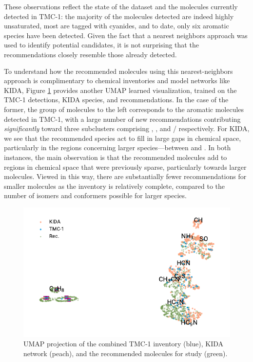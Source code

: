 \documentclass[twocolumn]{aastex63}
\begin{document}
These observations reflect the state of the dataset and the molecules currently detected in TMC-1: the majority of the molecules detected are indeed highly unsaturated, most are tagged with cyanides, and to date, only six aromatic species have been detected. Given the fact that a nearest neighbors approach was used to identify potential candidates, it is not surprising that the recommendations closely resemble those already detected. 

To understand how the recommended molecules using this nearest-neighbors approach is complimentary to chemical inventories and model networks like KIDA, Figure \ref{fig:umaprecs} provides another UMAP learned visualization, trained on the TMC-1 detections, KIDA species, and recommendations. In the case of the former, the group of molecules to the left corresponds to the aromatic molecules detected in TMC-1, with a large number of new recommendations contributing \emph{significantly} toward three subclusters comprising , , and / respectively. For KIDA, we see that the recommended species act to fill in large gaps in chemical space, particularly in the regions concerning larger species---between  and . In both instances, the main observation is that the recommended molecules add to regions in chemical space that were previously sparse, particularly towards larger molecules. Viewed in this way, there are substantially fewer recommendations for smaller molecules as the inventory is relatively complete, compared to the number of isomers and conformers possible for larger species.

\begin{figure}
    \centering
    \includegraphics[width=\columnwidth]{rec_umap.pdf}
    \caption{UMAP projection of the combined TMC-1 inventory (blue), KIDA network (peach), and the recommended molecules for study (green).}
    \label{fig:umaprecs}
\end{figure}
\end{document}
